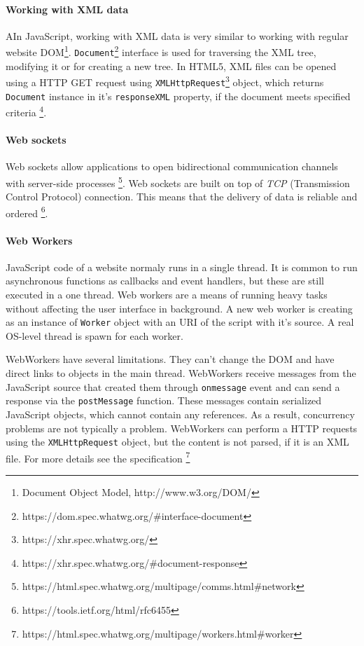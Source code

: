 \paragraph{Working with XML data}
AIn JavaScript, working with XML data is very similar to working with regular website DOM\footnote{Document Object Model, http://www.w3.org/DOM/}. \verb|Document|\footnote{https://dom.spec.whatwg.org/\#interface-document} interface is used for traversing the XML tree, modifying it or for creating a new tree. In HTML5, XML files can be opened using a HTTP GET request using \verb|XMLHttpRequest|\footnote{https://xhr.spec.whatwg.org/} object, which returns \verb|Document| instance in it's \verb|responseXML| property, if the document meets specified criteria \cite{}\footnote{https://xhr.spec.whatwg.org/\#document-response}.

\paragraph{Web sockets}
Web sockets allow applications to open bidirectional communication channels with server-side processes \cite{}\footnote{https://html.spec.whatwg.org/multipage/comms.html\#network}. Web sockets are built on top of \textit{TCP} (Transmission Control Protocol) connection. This means that the delivery of data is reliable and ordered \cite{}\footnote{https://tools.ietf.org/html/rfc6455}.

\paragraph{Web Workers}
JavaScript code of a website normaly runs in a single thread. It is common to run asynchronous functions as callbacks and event handlers, but these are still executed in a one thread. Web workers are a means of running heavy tasks without affecting the user interface in background. A new web worker is creating as an instance of \verb|Worker| object with an URI of the script with it's source. A real OS-level thread is spawn for each worker.

WebWorkers have several limitations. They can't change the DOM and have direct links to objects in the main thread. WebWorkers receive messages from the JavaScript source that created them through \verb|onmessage| event and can send a response via the \verb|postMessage| function. These messages contain serialized JavaScript objects, which cannot contain any references. As a result, concurrency problems are not typically a problem. WebWorkers can perform a HTTP requests using the \verb|XMLHttpRequest| object, but the content is not parsed, if it is an XML file. For more details see the specification \cite{} \footnote{https://html.spec.whatwg.org/multipage/workers.html\#worker}





